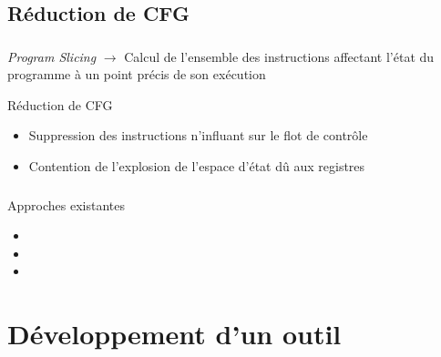 \documentclass{beamer}
\begin{document}
  \subsection{Réduction de CFG}
  \begin{frame}
    \frametitle{\secname}
    \framesubtitle{\subsecname}

    \begin{block}{\textit{Program Slicing}}
      $\rightarrow$ Calcul de l'ensemble des instructions affectant l'état du
      programme à un point précis de son exécution
    \end{block}

    \begin{block}{Réduction de CFG}
      \begin{itemize}
        \item Suppression des instructions n'influant sur le flot de contrôle
        \item Contention de l'explosion de l'espace d'état dû aux registres
      \end{itemize}
    \end{block}
  \end{frame}

  \begin{frame}
    \frametitle{\secname}
    \framesubtitle{\subsecname}
    \begin{exampleblock}{Approches existantes}
      \tiny
      \begin{itemize}
        \item {}
        \item {}
        \item {}
      \end{itemize}
    \end{exampleblock}
  \end{frame}

  \section{Développement d'un outil}
\end{document}
